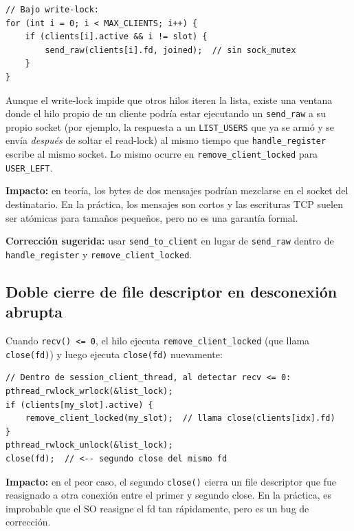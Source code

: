 \documentclass[12pt,a4paper]{article}
\begin{document}
\begin{lstlisting}[caption={USER\_JOINED sin sock\_mutex en handle\_register}]
// Bajo write-lock:
for (int i = 0; i < MAX_CLIENTS; i++) {
    if (clients[i].active && i != slot) {
        send_raw(clients[i].fd, joined);  // sin sock_mutex
    }
}
\end{lstlisting}

Aunque el write-lock impide que otros hilos iteren la lista, existe una ventana donde
el hilo propio de un cliente podría estar ejecutando un \texttt{send\_raw} a su
propio socket (por ejemplo, la respuesta a un \texttt{LIST\_USERS} que ya se armó
y se envía \textit{después} de soltar el read-lock) al mismo tiempo que
\texttt{handle\_register} escribe al mismo socket.  Lo mismo ocurre en
\texttt{remove\_client\_locked} para \texttt{USER\_LEFT}.

\textbf{Impacto:} en teoría, los bytes de dos mensajes podrían mezclarse en el
socket del destinatario.  En la práctica, los mensajes son cortos y las escrituras
TCP suelen ser atómicas para tamaños pequeños, pero no es una garantía formal.

\textbf{Corrección sugerida:} usar \texttt{send\_to\_client} en lugar de
\texttt{send\_raw} dentro de \texttt{handle\_register} y
\texttt{remove\_client\_locked}.

\subsection{Doble cierre de file descriptor en desconexión abrupta}

Cuando \texttt{recv() <= 0}, el hilo ejecuta \texttt{remove\_client\_locked} (que
llama \texttt{close(fd)}) y luego ejecuta \texttt{close(fd)} nuevamente:

\begin{lstlisting}[caption={Doble close en desconexión abrupta}]
// Dentro de session_client_thread, al detectar recv <= 0:
pthread_rwlock_wrlock(&list_lock);
if (clients[my_slot].active) {
    remove_client_locked(my_slot);  // llama close(clients[idx].fd)
}
pthread_rwlock_unlock(&list_lock);
close(fd);  // <-- segundo close del mismo fd
\end{lstlisting}

\textbf{Impacto:} en el peor caso, el segundo \texttt{close()} cierra un file
descriptor que fue reasignado a otra conexión entre el primer y segundo close.  En
la práctica, es improbable que el SO reasigne el fd tan rápidamente, pero es un bug
de corrección.
\end{document}
